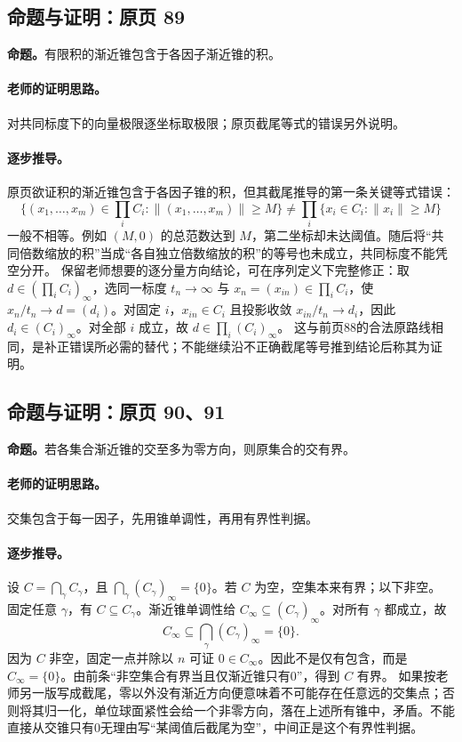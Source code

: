 \documentclass[11pt,a4paper]{article}
\theoremstyle{definition}\newtheorem{definition}{定义}\newtheorem{example}{例}
\begin{document}
\subsection{命题与证明：原页 89}

\textbf{命题。}有限积的渐近锥包含于各因子渐近锥的积。

\paragraph{老师的证明思路。}对共同标度下的向量极限逐坐标取极限；原页截尾等式的错误另外说明。

\paragraph{逐步推导。}
原页欲证积的渐近锥包含于各因子锥的积，但其截尾推导的第一条关键等式错误：
\[\{(x_1,\ldots,x_m)\in\prod_iC_i:\|(x_1,\ldots,x_m)\|\ge M\}\ne\prod_i\{x_i\in C_i:\|x_i\|\ge M\}\]
一般不相等。例如 $(M,0)$ 的总范数达到 $M$，第二坐标却未达阈值。随后将“共同倍数缩放的积”当成“各自独立倍数缩放的积”的等号也未成立，共同标度不能凭空分开。
保留老师想要的逐分量方向结论，可在序列定义下完整修正：取 $d\in(\prod_iC_i)_\infty$，选同一标度 $t_n\to\infty$ 与 $x_n=(x_{in})\in\prod_iC_i$，使 $x_n/t_n\to d=(d_i)$。对固定 $i$，$x_{in}\in C_i$ 且投影收敛 $x_{in}/t_n\to d_i$，因此 $d_i\in(C_i)_\infty$。对全部 $i$ 成立，故 $d\in\prod_i(C_i)_\infty$。
这与前页88的合法原路线相同，是补正错误所必需的替代；不能继续沿不正确截尾等号推到结论后称其为证明。


\subsection{命题与证明：原页 90、91}

\textbf{命题。}若各集合渐近锥的交至多为零方向，则原集合的交有界。

\paragraph{老师的证明思路。}交集包含于每一因子，先用锥单调性，再用有界性判据。

\paragraph{逐步推导。}
设 $C=\bigcap_\gamma C_\gamma$，且 $\bigcap_\gamma(C_\gamma)_\infty=\{0\}$。若 $C$ 为空，空集本来有界；以下非空。
固定任意 $\gamma$，有 $C\subseteq C_\gamma$。渐近锥单调性给 $C_\infty\subseteq(C_\gamma)_\infty$。对所有 $\gamma$ 都成立，故
\[C_\infty\subseteq\bigcap_\gamma(C_\gamma)_\infty=\{0\}.\]
因为 $C$ 非空，固定一点并除以 $n$ 可证 $0\in C_\infty$。因此不是仅有包含，而是 $C_\infty=\{0\}$。由前条“非空集合有界当且仅渐近锥只有0”，得到 $C$ 有界。
如果按老师另一版写成截尾，零以外没有渐近方向便意味着不可能存在任意远的交集点；否则将其归一化，单位球面紧性会给一个非零方向，落在上述所有锥中，矛盾。不能直接从交锥只有0无理由写“某阈值后截尾为空”，中间正是这个有界性判据。
\end{document}
